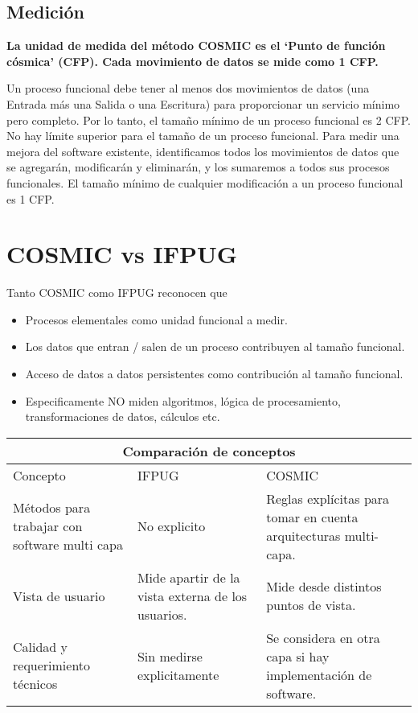 \documentclass{mylib/reporteCorto}
\begin{document}
\subsection{Medición}

\textbf{La unidad de medida del método COSMIC es el ‘Punto de función cósmica’ (CFP). Cada movimiento de datos se mide como 1 CFP.}

Un proceso funcional debe tener al menos dos movimientos de datos (una Entrada más una Salida o una Escritura) para proporcionar un servicio mínimo pero completo. Por lo tanto, el tamaño mínimo de un proceso funcional es 2 CFP. No hay límite superior para el tamaño de un proceso funcional.
Para medir una mejora del software existente, identificamos todos los movimientos de datos que se agregarán, modificarán y eliminarán, y los sumaremos a todos sus procesos funcionales. El tamaño mínimo de cualquier modificación a un proceso funcional es 1 CFP.

\section{COSMIC vs IFPUG }

Tanto COSMIC como IFPUG reconocen que

\begin{itemize}
	\item Procesos elementales como unidad funcional a medir.
	\item Los datos que entran / salen de un proceso contribuyen al tamaño funcional.
	\item Acceso de datos a datos persistentes como contribución al tamaño funcional.
	\item Especificamente NO miden algoritmos, lógica de procesamiento, transformaciones de datos,
cálculos etc.
\end{itemize}


\begin{center}
    \begin{tabular}{ | p{4cm} | p{4.5cm} |p{4.5cm} |}
    \hline
    \multicolumn{3}{|c|}{Comparación de conceptos} \\
  	\hline

	Concepto & IFPUG & COSMIC \\ \hline
	
	Métodos para trabajar con software multi capa &
	No explicito &
	Reglas explícitas para tomar en cuenta arquitecturas multi-capa. \\ \hline

	Vista de usuario & 
	Mide apartir de la vista externa de los usuarios. &
	Mide desde distintos puntos de vista. \\ \hline

	Calidad y requerimiento técnicos &
	Sin medirse explicitamente &
	Se considera en otra capa si hay implementación de software. \\ \hline

    \end{tabular}
\end{center}
\end{document}
